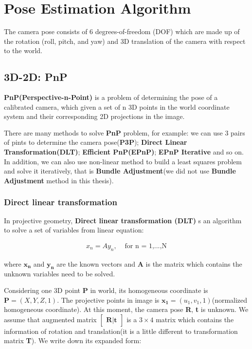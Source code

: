 \chapter{Pose Estimation Algorithm}
\label{chap:Pose_Estimation_Algorithm}

The camera pose consists of 6 degrees-of-freedom (DOF) which are made up of the rotation (roll, pitch, and yaw) and 3D translation of the camera with respect to the world.%
\section{3D-2D: PnP}

\textbf{PnP(Perspective-n-Point)} is a problem of determining the pose of a calibrated camera, which given a set of n 3D points in the world coordinate system and their corresponding 2D projections in the image\cite{wiki_pnp}.

There are many methods to solve \textbf{PnP} problem, for example: we can use 3 pairs of pints to determine the camera pose(\textbf{P3P}); \textbf{Direct Linear Transformation(DLT)}; \textbf{Efficient PnP(EPnP)}; \textbf{EPnP Iterative} and so on. In addition, we can also use non-linear method to build a least squares problem and solve it iteratively, that is \textbf{Bundle Adjustment}(we did not use \textbf{Bundle Adjustment} method in this thesis). 

\subsection{Direct linear transformation}
In projective geometry, \textbf{Direct linear transformation (DLT)} s an algorithm to solve a set of variables from linear equation:

\begin{align*}
   x_n = Ay_n,  & \text{ for n = 1,...,N}          
\end{align*}

where $\boldsymbol{x_n}$ and $\boldsymbol{y_n}$ are the known vectors and \textbf{A} is the matrix which contains the unknown variables need to be solved.

Considering one 3D point \textbf{P} in world, its homogeneous coordinate is $\boldsymbol{P} = (X,Y,Z,1)$. The projective points in image is $\boldsymbol{x_1} = (u_1,v_1,1)$(normalized homogeneous coordinate). At this moment, the camera pose \textbf{R}, \textbf{t} is unknown. We assume that augmented matrix 
$ \boldsymbol{\begin{bmatrix} R|t \end{bmatrix}} $ is a $3 \times 4$ matrix which contains the information of rotation and translation(it is a little different to transformation matrix \textbf{T}). We write down its expanded form:

